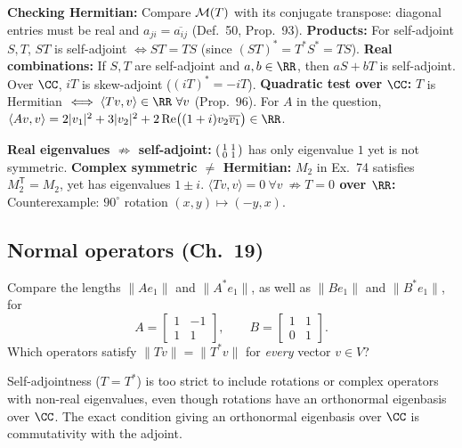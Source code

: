 \documentclass[10pt]{scrartcl}
\begin{document}
\begin{shortcuts}
  \ii \textbf{Checking Hermitian:} Compare $\mathcal M(T)$ with its conjugate transpose: diagonal entries must be real and $a_{ji}=\overline{a_{ij}}$ (Def.~50, Prop.~93).
  \ii \textbf{Products:} For self-adjoint $S,T$, $ST$ is self-adjoint $\iff ST=TS$ (since $(ST)^*=T^*S^*=TS$).
  \ii \textbf{Real combinations:} If $S,T$ are self-adjoint and $a,b\in\RR$, then $aS+bT$ is self-adjoint. Over $\CC$, $iT$ is skew-adjoint ($(iT)^*=-iT$).
  \ii \textbf{Quadratic test over $\CC$:} $T$ is Hermitian $\iff \langle Tv,v\rangle\in\RR\ \forall v$ (Prop.~96). For $A$ in the question, $\langle Av,v\rangle = 2|v_1|^2+3|v_2|^2+2\operatorname{Re}\bigl((1+i)v_2\overline{v_1}\bigr)\in\RR$.
\end{shortcuts}

\begin{trapbox}
  \ii \textbf{Real eigenvalues $\not\Rightarrow$ self-adjoint:} $\begin{psmallmatrix}1&1\\0&1\end{psmallmatrix}$ has only eigenvalue $1$ yet is not symmetric.
  \ii \textbf{Complex symmetric $\neq$ Hermitian:} $M_2$ in Ex.~74 satisfies $M_2^{\mathsf T}=M_2$, yet has eigenvalues $1\pm i$.
  \ii \textbf{$\langle Tv,v\rangle=0\ \forall v\ \not\Rightarrow T=0$ over $\RR$:} Counterexample: $90^\circ$ rotation $(x,y)\mapsto(-y,x)$.
\end{trapbox}

\subsection{Normal operators (Ch.~19)}

\begin{qbox}
  Compare the lengths $\|Ae_1\|$ and $\|A^*e_1\|$, as well as $\|Be_1\|$ and $\|B^*e_1\|$, for
  \[
    A=\begin{bmatrix}1&-1\\1&1\end{bmatrix}, \qquad B=\begin{bmatrix}1&1\\0&1\end{bmatrix}.
  \]
  Which operators satisfy $\|Tv\|=\|T^*v\|$ for \emph{every} vector $v\in V$?
\end{qbox}

Self-adjointness ($T=T^*$) is too strict to include rotations or complex operators with non-real eigenvalues, even though rotations have an orthonormal eigenbasis over $\CC$. The exact condition giving an orthonormal eigenbasis over $\CC$ is commutativity with the adjoint.
\end{document}
